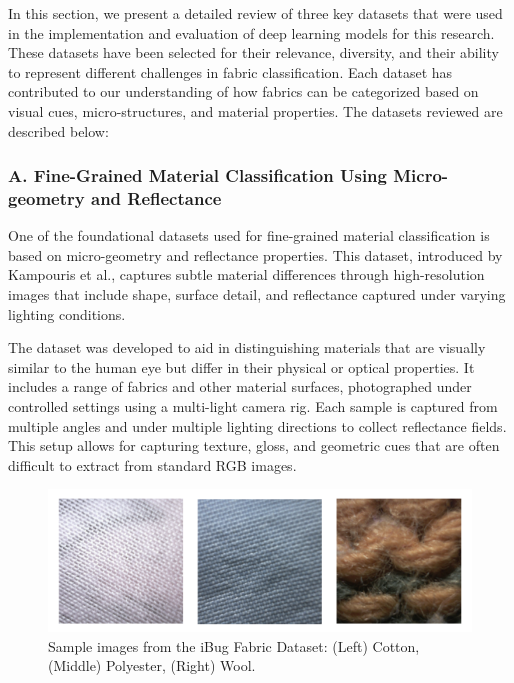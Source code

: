 In this section, we present a detailed review of three key datasets that were used in the implementation and evaluation of deep learning models for this research. These datasets have been selected for their relevance, diversity, and their ability to represent different challenges in fabric classification. Each dataset has contributed to our understanding of how fabrics can be categorized based on visual cues, micro-structures, and material properties. The datasets reviewed are described below:

\subsubsection{A. Fine-Grained Material Classification Using Micro-geometry and Reflectance~\cite{kampouris2016fine}}

One of the foundational datasets used for fine-grained material classification is based on micro-geometry and reflectance properties. This dataset, introduced by Kampouris et al., captures subtle material differences through high-resolution images that include shape, surface detail, and reflectance captured under varying lighting conditions.

The dataset was developed to aid in distinguishing materials that are visually similar to the human eye but differ in their physical or optical properties. It includes a range of fabrics and other material surfaces, photographed under controlled settings using a multi-light camera rig. Each sample is captured from multiple angles and under multiple lighting directions to collect reflectance fields. This setup allows for capturing texture, gloss, and geometric cues that are often difficult to extract from standard RGB images.

\begin{figure}[H]
    \centering
    \begin{minipage}{0.8\linewidth}
        \includegraphics[width=\linewidth]{images/iBugDataset}
    \end{minipage}
    \caption[Sample images from the iBug Fabric Dataset]{Sample images from the iBug Fabric Dataset: (Left) Cotton, (Middle) Polyester, (Right) Wool.}
\end{figure}

